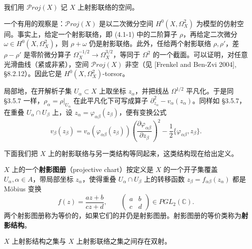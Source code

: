 我们用 $\mathcal{P}roj(X)$ 记 $X$ 上射影联络的空间。

一个有用的观察是：$\mathcal{P}roj(X)$ 是以二次微分空间 $H^0(X,\Omega_X^2)$ 为模型的仿射空间。事实上，给定一个射影联络，即 (4.1-1) 中的二阶算子 $\rho$，再给定二次微分 $\omega\in H^0(X,\Omega_X^2)$，则 $\rho+\omega$ 仍是射影联络。此外，任给两个射影联络 $\rho,\rho'$，差 $\rho-\rho'$ 是零阶微分算子 $\Omega_X^{-1/2}\to\Omega_X^{3/2}$，等同于 $\Omega^2$ 的一个截面。可以证明，对任意光滑曲线（紧或非紧），空间 $\mathcal{P}roj(X)$ 非空（见 [Frenkel and Ben-Zvi 2004], §8.2.12）。因此它是 $H^0(X,\Omega_X^2)$-torsor。

局部地，在开解析子集 $U_\alpha\subset X$ 上取坐标 $z_\alpha$，并把线丛 $\Omega^{1/2}$ 平凡化。于是同 §3.5.7 一样，$\rho_\alpha=\rho|_{U_\alpha}$ 在此平凡化下可写成算子 $\partial_{z_\alpha}^2-v_\alpha(z_\alpha)$。同样如 §3.5.7，在重叠 $U_\alpha\cap U_\beta$ 上，设 $z_\alpha=\varphi_{\alpha\beta}(z_\beta)$，便有变换公式
\begin{equation}
    v_\beta(z_\beta)=v_\alpha(\varphi_{\alpha\beta}(z_\beta))\left(\frac{\partial\varphi_{\alpha\beta}}{\partial z_\beta}\right)^2-\frac{1}{2}\{\varphi_{\alpha\beta},z_\beta\}.
    \tag{4.1-2}
\end{equation}


下面我们把 $X$ 上的射影联络与另一类结构等同起来，这类结构现在给出定义。

$X$ 上的一个\textbf{射影图册}（projective chart）按定义是 $X$ 的一个开子集覆盖 $U_\alpha,\alpha\in A$，带局部坐标 $z_\alpha$，使得重叠 $U_\alpha\cap U_\beta$ 上的转移函数 $z_\beta=f_{\alpha\beta}(z_\alpha)$ 都是 Möbius 变换
\[
    f(z)=\frac{az+b}{cz+d},\qquad\begin{pmatrix}a&b\\c&d\end{pmatrix}\in PGL_2(\mathbb{C}).
\]
两个射影图册称为等价的，如果它们的并仍是射影图册。射影图册的等价类称为\textbf{射影结构}。

\begin{proposition}
    $X$ 上射影结构之集与 $X$ 上射影联络之集之间存在双射。
\end{proposition}

